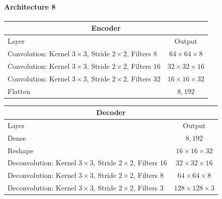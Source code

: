 \paragraph{Architecture 8}

\begin{center}
    \begin{table}[H]
        \centering
        \begin{tabular}{ | l | c | }
            \multicolumn{2}{c}{Encoder} \\ \hline
            Layer & Output\\ \hline
            Convolution: Kernel $3\times3$, Stride $2\times2$, Filters $8  $    & $64\times 64\times 8  $    \\  
            Convolution: Kernel $3\times3$, Stride $2\times2$, Filters $16 $    & $32\times 32\times 16 $    \\
            Convolution: Kernel $3\times3$, Stride $2\times2$, Filters $32 $    & $16\times 16\times 32 $    \\
            Flatten                                                             & $8,192$                    \\
            \hline
        \end{tabular}
    \end{table}
\end{center}
\vspace{-4em}
\begin{center}
    \begin{table}[H]
        \centering
        \begin{tabular}{ | l | c | }
            \multicolumn{2}{c}{Decoder} \\ \hline
            Layer & Output\\ \hline
            Dense                                                                   & $8,192$                   \\
            Reshape                                                                 & $16\times 16\times  32 $  \\
            Deconvolution: Kernel $3\times3$, Stride $2\times2$, Filters $16 $      & $32\times 32\times  16 $  \\
            Deconvolution: Kernel $3\times3$, Stride $2\times2$, Filters $8  $      & $64\times 64\times  8  $  \\
            Deconvolution: Kernel $3\times3$, Stride $2\times2$, Filters $3  $      & $128\times 128\times3  $  \\
            \hline
        \end{tabular} 
    \end{table}
\end{center}

